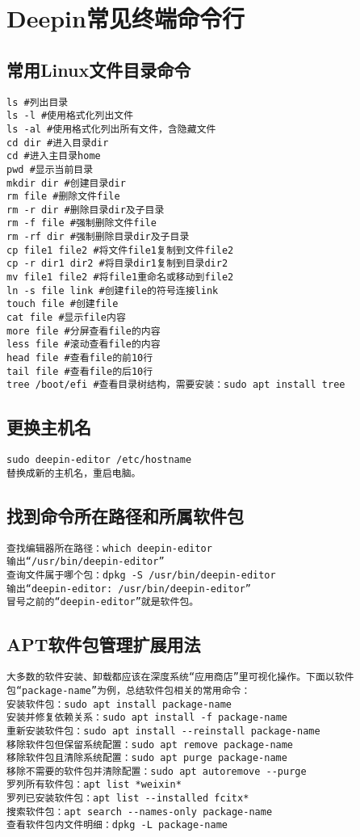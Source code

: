 \documentclass[a4paper,fontset=fandol,zihao=-4,linespread=1.2]{ctexbook}
\begin{document}
\chapter{Deepin常见终端命令行}

\section{常用Linux文件目录命令}
\begin{lstlisting}
ls #列出目录
ls -l #使用格式化列出文件
ls -al #使用格式化列出所有文件，含隐藏文件
cd dir #进入目录dir
cd #进入主目录home
pwd #显示当前目录
mkdir dir #创建目录dir
rm file #删除文件file
rm -r dir #删除目录dir及子目录
rm -f file #强制删除文件file
rm -rf dir #强制删除目录dir及子目录
cp file1 file2 #将文件file1复制到文件file2
cp -r dir1 dir2 #将目录dir1复制到目录dir2
mv file1 file2 #将file1重命名或移动到file2
ln -s file link #创建file的符号连接link
touch file #创建file
cat file #显示file内容
more file #分屏查看file的内容
less file #滚动查看file的内容
head file #查看file的前10行
tail file #查看file的后10行
tree /boot/efi #查看目录树结构，需要安装：sudo apt install tree
\end{lstlisting}

\section{更换主机名}
\begin{lstlisting}
sudo deepin-editor /etc/hostname
替换成新的主机名，重启电脑。
\end{lstlisting}

\section{找到命令所在路径和所属软件包}
\begin{lstlisting}
查找编辑器所在路径：which deepin-editor
输出“/usr/bin/deepin-editor”
查询文件属于哪个包：dpkg -S /usr/bin/deepin-editor
输出“deepin-editor: /usr/bin/deepin-editor”
冒号之前的“deepin-editor”就是软件包。
\end{lstlisting}

\section{APT软件包管理扩展用法}
\begin{lstlisting}
大多数的软件安装、卸载都应该在深度系统“应用商店”里可视化操作。下面以软件包“package-name”为例，总结软件包相关的常用命令：
安装软件包：sudo apt install package-name
安装并修复依赖关系：sudo apt install -f package-name
重新安装软件包：sudo apt install --reinstall package-name
移除软件包但保留系统配置：sudo apt remove package-name
移除软件包且清除系统配置：sudo apt purge package-name
移除不需要的软件包并清除配置：sudo apt autoremove --purge
罗列所有软件包：apt list *weixin*
罗列已安装软件包：apt list --installed fcitx*
搜索软件包：apt search --names-only package-name
查看软件包内文件明细：dpkg -L package-name
\end{lstlisting}
\end{document}
